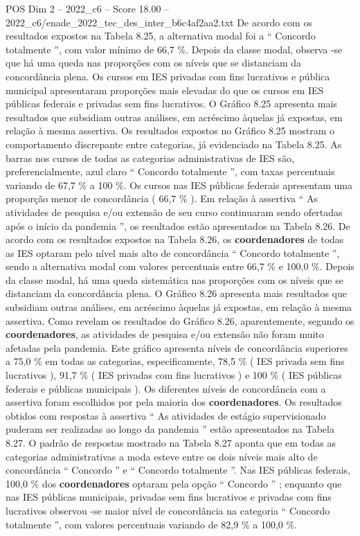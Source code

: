 \begin{textsample}{POS Dim 2 – 2022\_c6 – Score 18.00 – 2022\_c6/enade\_2022\_tec\_des\_inter\_b6c4af2aa2.txt}
De acordo com os resultados expostos na Tabela 8.25, a alternativa modal foi a “ Concordo totalmente ”, com valor mínimo de 66,7 \%.
Depois da classe modal, observa -se que há uma queda nas proporções com os níveis que se distanciam da concordância plena.
Os cursos em IES privadas com fins lucrativos e pública municipal apresentaram proporções mais elevadas do que os cursos em IES públicas federais e privadas sem fins lucrativos.
O Gráfico 8.25 apresenta mais resultados que subsidiam outras análises, em acréscimo àquelas já expostas, em relação à mesma assertiva.
Os resultados expostos no Gráfico 8.25 mostram o comportamento discrepante entre categorias, já evidenciado na Tabela 8.25.
As barras nos cursos de todas as categorias administrativas de IES são, preferencialmente, azul claro “ Concordo totalmente ”, com taxas percentuais variando de 67,7 \% a 100 \%.
Os cursos nas IES públicas federais apresentam uma proporção menor de concordância ( 66,7 \% ).
Em relação à assertiva “ As atividades de pesquisa e/ou extensão de seu curso continuaram sendo ofertadas após o início da pandemia ”, os resultados estão apresentados na Tabela 8.26.
De acordo com os resultados expostos na Tabela 8.26, os \textbf{coordenadores} de todas as IES optaram pelo nível mais alto de concordância “ Concordo totalmente ”, sendo a alternativa modal com valores percentuais entre 66,7 \% e 100,0 \%.
Depois da classe modal, há uma queda sistemática nas proporções com os níveis que se distanciam da concordância plena.
O Gráfico 8.26 apresenta mais resultados que subsidiam outras análises, em acréscimo àquelas já expostas, em relação à mesma assertiva.
Como revelam os resultados do Gráfico 8.26, aparentemente, segundo os \textbf{coordenadores}, as atividades de pesquisa e/ou extensão não foram muito afetadas pela pandemia.
Este gráfico apresenta níveis de concordância superiores a 75,0 \% em todas as categorias, especificamente, 78,5 \% ( IES privada sem fins lucrativos ), 91,7 \% ( IES privadas com fins lucrativos ) e 100 \% ( IES públicas federais e públicas municipais ).
Os diferentes níveis de concordância com a assertiva foram escolhidos por pela maioria dos \textbf{coordenadores}.
Os resultados obtidos com respostas à assertiva “ As atividades de estágio supervisionado puderam ser realizadas ao longo da pandemia ” estão apresentados na Tabela 8.27.
O padrão de respostas mostrado na Tabela 8.27 aponta que em todas as categorias administrativas a moda esteve entre os dois níveis mais alto de concordância “ Concordo ” e “ Concordo totalmente ”.
Nas IES públicas federais, 100,0 \% dos \textbf{coordenadores} optaram pela opção “ Concordo ” ; enquanto que nas IES públicas municipais, privadas sem fins lucrativos e privadas com fins lucrativos observou -se maior nível de concordância na categoria “ Concordo totalmente ”, com valores percentuais variando de 82,9 \% a 100,0 \%.

\end{textsample}
